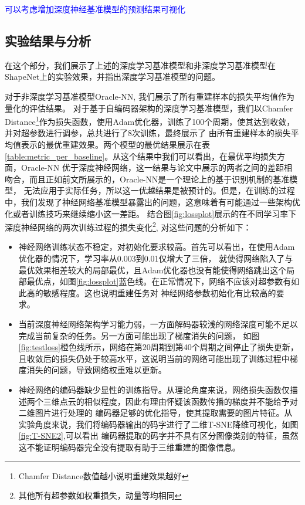 \documentclass[bachelor, nocolorlinks, printoneside]{seuthesis} %
\newcommand\TODO[1]{\textcolor{blue}{#1}}
\begin{document}
\begin{Main}
\TODO{可以考虑增加深度神经基准模型的预测结果可视化}
\subsection{实验结果与分析}

在这个部分，我们展示了上述的深度学习基准模型和非深度学习基准模型在ShapeNet上的实验效果，并指出深度学习基准模型的问题。

对于非深度学习基准模型Oracle-NN, 我们展示了所有重建样本的损失平均值作为量化的评估结果。
对于基于自编码器架构的深度学习基准模型，我们以Chamfer Distance\footnote[2]{Chamfer Distance数值越小说明重建效果越好}作为损失函数，使用Adam优化器，训练了100个周期，使其达到收敛，并对超参数进行调参，总共进行了8次训练，最终展示了
由所有重建样本的损失平均值表示的最优重建效果。两个模型的最优结果展示在表\ref{table:metric_per_baseline}。从这个结果中我们可以看出，在最优平均损失方面，Oracle-NN
优于深度神经网络，这一结果与论文\cite{tatarchenko2019single}中展示的两者之间的差距相吻合，而且正如前文所展示的，Oracle-NN是一个理论上的基于识别机制的基准模型，
无法应用于实际任务，所以这一优越结果是被预计的。但是，在训练的过程中，我们发现了神经网络基准模型暴露出的问题，这意味着有可能通过一些架构优化或者训练技巧来继续缩小这一差距。
结合图\ref{fig:lossplot}展示的在不同学习率下深度神经网络的两次训练过程的损失变化\footnote[1]{其他所有超参数如权重损失，动量等均相同}, 对这些问题的分析如下：
\begin{itemize}
    \item 神经网络训练状态不稳定，对初始化要求较高。首先可以看出，在使用Adam优化器的情况下，学习率从0.003到0.01仅增大了三倍，
        就使得网络陷入了与最优效果相差较大的局部最优，且Adam优化器也没有能使得网络跳出这个局部最优点，如图\ref{fig:lossplot}蓝色线。在正常情况下，网络不应该对超参数有如此高的敏感程度。这也说明重建任务对
        神经网络参数初始化有比较高的要求。
    \item 当前深度神经网络架构学习能力弱，一方面解码器较浅的网络深度可能不足以完成当前复杂的任务。另一方面可能出现了梯度消失的问题，
    如图\ref{fig:testloss}橙色线所示，网络在第20周期到第40个周期之间停止了损失更新，
    且收敛后的损失仍处于较高水平，这说明当前的网络可能出现了训练过程中梯度消失的问题，导致网络权重难以更新。
    \item 神经网络的编码器缺少显性的训练指导。从理论角度来说，网络损失函数仅描述两个三维点云的相似程度，因此有理由怀疑该函数传播的梯度并不能给予对二维图片进行处理的
    编码器足够的优化指导，使其提取需要的图片特征。从实验角度来说，我们将编码器输出的码字进行了二维T-SNE降维可视化，如图\ref{fig:T-SNE2},可以看出
    编码器提取的码字并不具有区分图像类别的特征，虽然这不能证明编码器完全没有提取有助于三维重建的图像信息。
\end{itemize}


\end{Main}
\end{document}
